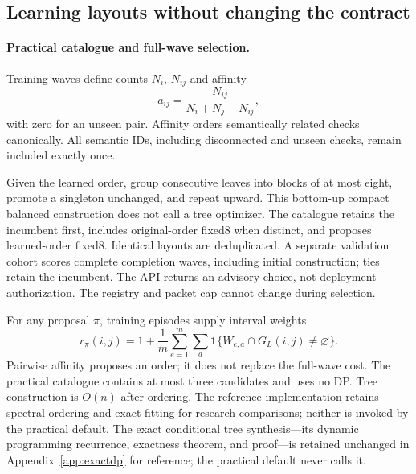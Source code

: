\subsection{Learning layouts without changing the contract}\label{sec:compiler}
\paragraph{Practical catalogue and full-wave selection.}\label{sec:catalogue}
Training waves define counts $N_i$, $N_{ij}$ and affinity
\begin{equation}a_{ij}=\frac{N_{ij}}{N_i+N_j-N_{ij}},\label{eq:affinity}\end{equation}
with zero for an unseen pair. Affinity orders semantically related checks
canonically. All semantic IDs, including disconnected and unseen checks, remain
included exactly once.

Given the learned order, group consecutive leaves into blocks of at most eight,
promote a singleton unchanged, and repeat upward. This bottom-up compact balanced
construction does not call a tree optimizer. The catalogue retains the incumbent
first, includes original-order fixed8 when distinct, and proposes learned-order
fixed8. Identical layouts are deduplicated. A separate validation cohort scores
complete completion waves, including initial construction; ties retain the
incumbent. The API returns an advisory choice, not deployment authorization. The
registry and packet cap cannot change during selection.

For any proposal $\pi$, training episodes supply interval weights
\begin{equation}r_\pi(i,j)=1+\frac{1}{m}\sum_{e=1}^{m}\sum_{a}\mathbf 1\{W_{e,a}\cap G_L(i,j)\ne\varnothing\}.\label{eq:weights}\end{equation}
Pairwise affinity proposes an order; it does not replace the full-wave cost. The
practical catalogue contains at most three candidates and uses no DP. Tree
construction is $O(n)$ after ordering. The reference implementation retains
spectral ordering and exact fitting for research comparisons; neither is invoked
by the practical default. The exact conditional tree synthesis---its dynamic
programming recurrence, exactness theorem, and proof---is retained unchanged in
Appendix~\ref{app:exactdp} for reference; the practical default never calls it.


